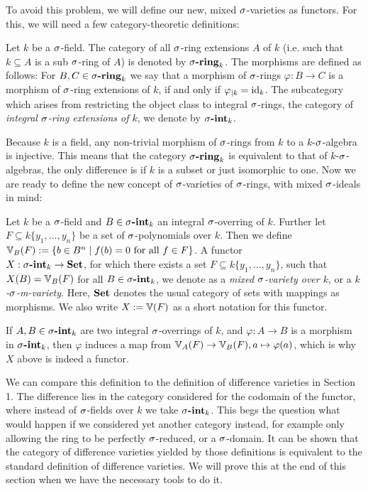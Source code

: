 To avoid this problem, we will define our new, mixed $\sigma$-varieties as functors. For this, we will need a few category-theoretic definitions:

\begin{defn}
Let $k$ be a $\sigma$-field. The category of all $\sigma$-ring extensions $A$ of $k$ (i.e. such that $k \subseteq A$ is a sub $\sigma$-ring of $A$) is denoted by $\sringk$. The morphisms are defined as follows: For $B,C \in \sigma\text{{\normalfont\textbf{-ring}}}_k$ we say that a morphism of $\sigma$-rings $\varphi: B \rightarrow C$ is a morphism of $\sigma$-ring extensions of $k$, if and only if $\varphi_{|k} = \text{id}_k$.
The subcategory which arises from restricting the object class to integral $\sigma$-rings, the category of \emph{integral $\sigma$-ring extensions of $k$}, we denote by $\sintk$. \index{$\sintk$} \index{$\sringk$} 
\end{defn}

Because $k$ is a field, any non-trivial morphism of $\sigma$-rings from $k$ to a $k$-$\sigma$-algebra is injective. This means that the category $\sringk$ is equivalent to that of $k$-$\sigma$-algebras, the only difference is if $k$ is a subset or just isomorphic to one. Now we are ready to define the new concept of $\sigma$-varieties of $\sigma$-rings, with mixed $\sigma$-ideals in mind:

\begin{defn}\label{defnVV}
Let $k$ be a $\sigma$-field and $B \in \sigma\text{{\normalfont\textbf{-int}}}_k$ an integral $\sigma$-overring of $k$. Further let $F \subseteq k\{y_1, \ldots, y_n\}$ be a set of $\sigma$-polynomials over $k$. 
Then we define $\mathbb{V}_B(F):= \{ b \in B^n \mid f(b) = 0 \text{ for all } f \in F \}$. A functor \\ $X: \sigma\text{{\normalfont\textbf{-int}}}_k \rightarrow {\normalfont\textbf{Set}}$, for which there exists a set $F \subseteq k\{y_1, \ldots, y_n \}$, such that $X(B) = \mathbb{V}_B(F)$ for all $B \in \sigma\text{{\normalfont\textbf{-int}}}_k$, we denote as a \emph{mixed $\sigma$-variety over $k$}, or a \emph{$k$-$\sigma$-m-variety}.
Here, ${\normalfont\textbf{Set}}$ denotes the usual category of sets with mappings as morphisms. We also write $X := \mathbb{V}(F)$ as a short notation for this functor.   
\end{defn}

If $A,B \in \sigma\text{{\normalfont\textbf{-int}}}_k$ are two integral $\sigma$-overrings of $k$, and $\varphi: A \rightarrow B$ is a morphism in $\sintk$, then $\varphi$ induces a map from $\mathbb{V}_A(F) \rightarrow \mathbb{V}_B(F), a \mapsto \varphi(a)$, which is why $X$ above is indeed a functor.

We can compare this definition to the definition of difference varieties in Section 1. The difference lies in the category considered for the codomain of the functor, where instead of $\sigma$-fields over $k$ we take $\sintk$.
This begs the question what would happen if we considered yet another category instead, for example only allowing the ring to be perfectly $\sigma$-reduced, or a $\sigma$-domain. It can be shown that the category of difference varieties
yielded by those definitions is equivalent to the standard definition of difference varieties. We will prove this at the end of this section when we have the necessary tools to do it.

